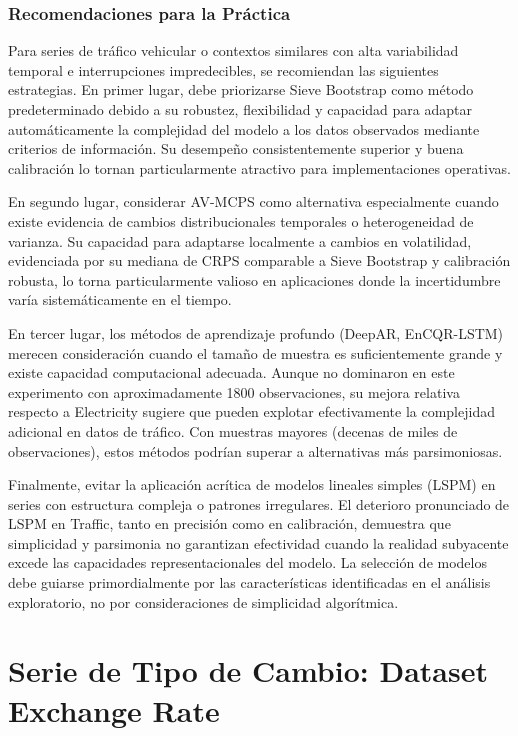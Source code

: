 \subsubsection{Recomendaciones para la Práctica}

Para series de tráfico vehicular o contextos similares con alta variabilidad temporal e interrupciones impredecibles, se recomiendan las siguientes estrategias. En primer lugar, debe priorizarse Sieve Bootstrap como método predeterminado debido a su robustez, flexibilidad y capacidad para adaptar automáticamente la complejidad del modelo a los datos observados mediante criterios de información. Su desempeño consistentemente superior y buena calibración lo tornan particularmente atractivo para implementaciones operativas.

En segundo lugar, considerar AV-MCPS como alternativa especialmente cuando existe evidencia de cambios distribucionales temporales o heterogeneidad de varianza. Su capacidad para adaptarse localmente a cambios en volatilidad, evidenciada por su mediana de CRPS comparable a Sieve Bootstrap y calibración robusta, lo torna particularmente valioso en aplicaciones donde la incertidumbre varía sistemáticamente en el tiempo.

En tercer lugar, los métodos de aprendizaje profundo (DeepAR, EnCQR-LSTM) merecen consideración cuando el tamaño de muestra es suficientemente grande y existe capacidad computacional adecuada. Aunque no dominaron en este experimento con aproximadamente 1800 observaciones, su mejora relativa respecto a Electricity sugiere que pueden explotar efectivamente la complejidad adicional en datos de tráfico. Con muestras mayores (decenas de miles de observaciones), estos métodos podrían superar a alternativas más parsimoniosas.

Finalmente, evitar la aplicación acrítica de modelos lineales simples (LSPM) en series con estructura compleja o patrones irregulares. El deterioro pronunciado de LSPM en Traffic, tanto en precisión como en calibración, demuestra que simplicidad y parsimonia no garantizan efectividad cuando la realidad subyacente excede las capacidades representacionales del modelo. La selección de modelos debe guiarse primordialmente por las características identificadas en el análisis exploratorio, no por consideraciones de simplicidad algorítmica.
\section{Serie de Tipo de Cambio: Dataset Exchange Rate}
\label{sec:aplicacion_exchange}

